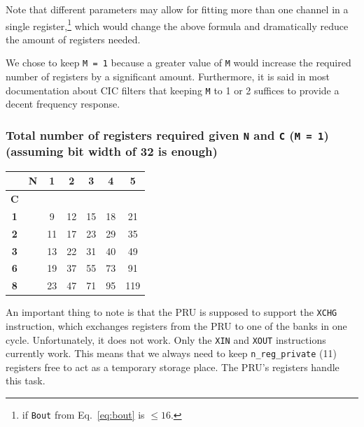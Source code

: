 \documentclass[]{report}
\begin{document}
Note that different parameters may allow for fitting more than one
channel in a single register,\footnote{if \texttt{B\textunderscore out} from Eq.~\ref{eq:bout} is $ \leq 16 $.} which would change the above formula and
dramatically reduce the amount of registers needed.

We chose to keep \texttt{M = 1} because a greater value of \texttt{M} would increase the required number of registers by a significant amount. Furthermore, it is said in most documentation about CIC filters that keeping \texttt{M} to 1 or 2 suffices to provide a decent frequency response.


\hypertarget{total-number-of-registers-required-given-n-and-c-m-1-assuming-bit-width-of-32-is-enough}{%
\subsubsection{\texorpdfstring{Total number of registers required given
\texttt{N} and \texttt{C} (\texttt{M\ =\ 1}) (assuming bit width of 32
is
enough)}{Total number of registers required given N and C (M = 1) (assuming bit width of 32 is enough)}}\label{total-number-of-registers-required-given-n-and-c-m-1-assuming-bit-width-of-32-is-enough}}

\begin {table}[H]
\begin{center}
\begin{tabular}{|c|c|c|c|c|c|c|}
	\hline  & \textbf{N} & \textbf{1} & \textbf{2} & \textbf{3} & \textbf{4} & \textbf{5} \\ 
	\hline \textbf{C} & & & & & & \\ 
	\hline  \textbf{1} & & 9 & 12 & 15 & 18 & 21 \\ 
	\hline \textbf{2} & & 11 & 17 & 23 & 29 & 35 \\ 
	\hline  \textbf{3} & & 13 & 22 & 31 & 40 & 49  \\ 
	\hline \textbf{6} & & 19 & 37 & 55 & 73 & 91 \\ 
	\hline \textbf{8} & & 23 & 47 & 71 & 95 & 119  \\ 
	\hline 
\end{tabular} 
\end{center}
\end {table}

An important thing to note is that the PRU is supposed to support the
\texttt{XCHG} instruction, which exchanges registers from the PRU to one of the
banks in one cycle. Unfortunately, it does not work. Only the \texttt{XIN} and
\texttt{XOUT} instructions currently work. This means that we always need to keep
\texttt{n\_reg\_private} (11) registers free to act as a temporary
storage place. The PRU's registers handle this task.
\end{document}
